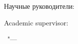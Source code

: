 %
\vspace{0pt plus4fill} %
\begin{flushright}
	\ifdefined\supervisorTwoFio
	Научные руководители:
	
	\supervisorRegalia
	
	\ifdefined\supervisorDead
	\framebox{\supervisorFio}
	\else
	\supervisorFio
	\fi
	
	\supervisorTwoRegalia
	
	\ifdefined\supervisorTwoDead
	\framebox{\supervisorTwoFio}
	\else
	\supervisorTwoFio
	\fi
	\else
	Academic supervisor:
	
	\supervisorRegaliaEng
	
	\ifdefined\supervisorDead
	\framebox{\supervisorFioEng}
	\else
	\textbf{\supervisorFioEng}
	\fi
	\fi
	
\end{flushright}
%
\vspace{0pt plus4fill} %
{\centering\thesisCityEng\ "--- \thesisYear\par}
